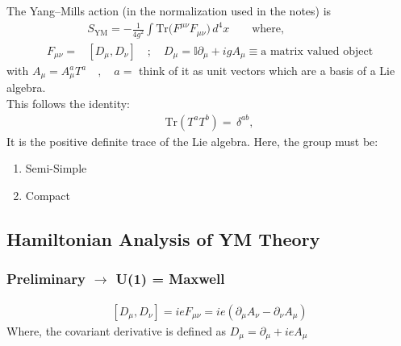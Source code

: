\documentclass[14pt]{article} %
\begin{document}
The Yang--Mills action (in the normalization used in the notes) is
\begin{align*}
&S_{\mathrm{YM}} = -\frac{1}{4g^{2}}\int \mathrm{Tr}\!\bigl(F^{\mu\nu}F_{\mu\nu}\bigr)\,d^{4}x \qquad \text{where,} \\
F_{\mu\nu} = &[D_{\mu},D_{\nu}] \quad; \quad D_{\mu} = \mathbb{I}\partial_{\mu} + i g A_{\mu} \equiv \text{a matrix valued object}
\end{align*}
with $A_{\mu}=A_{\mu}^{a}T^{a} \quad, \quad a=$ think of it as unit vectors which are a basis of a Lie algebra. \\

This follows the identity:
\begin{align*}
\mathrm{Tr}(T^{a}T^{b}) =\,\delta^{ab},
\end{align*}
It is the positive definite trace of the Lie algebra. Here, the group must be:
\begin{enumerate}
    \item Semi-Simple 
    \item Compact
\end{enumerate}

\subsection{Hamiltonian Analysis of YM Theory}
\subsubsection*{Preliminary $\longrightarrow$ U(1) = Maxwell}
\begin{align*}
    \left[D_\mu, D_\nu \right] = i e F_{\mu\nu} = ie \left(\partial_\mu A_\nu - \partial_\nu A_\mu \right)
\end{align*}
Where, the covariant derivative is defined as $D_\mu= \partial_\mu + ie A_\mu$ \\
\end{document}
